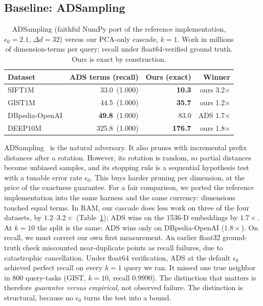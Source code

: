 \documentclass[sigconf, nonacm]{acmart}
\begin{document}
\subsection{Baseline: ADSampling}
\label{sec:ads}

\begin{table}[t]
\caption{ADSampling (faithful NumPy port of the reference implementation,
$\epsilon_0{=}2.1$, $\Delta d{=}32$) versus our PCA-only cascade, $k=1$.
Work in millions of dimension-terms per query; recall under
float64-verified ground truth. Ours is exact by construction.}
\label{tab:ads}
\small
\begin{tabular}{@{}lrrr@{}}
\toprule
Dataset & ADS terms (recall) & Ours (exact) & Winner \\
\midrule
SIFT1M & 33.0 \,(1.000) & \textbf{10.3} & ours 3.2$\times$ \\
GIST1M & 44.5 \,(1.000) & \textbf{35.7} & ours 1.2$\times$ \\
DBpedia-OpenAI & \textbf{49.8} \,(1.000) & 83.0 & ADS 1.7$\times$ \\
DEEP10M & 325.8 \,(1.000) & \textbf{176.7} & ours 1.8$\times$ \\
\bottomrule
\end{tabular}
\end{table}

ADSampling~\cite{adsampling} is the natural adversary. It also prunes
with incremental prefix distances after a rotation. However, its rotation
is random, so partial distances become unbiased samples, and its stopping
rule is a sequential hypothesis test with a tunable error rate
$\epsilon_0$. This buys harder pruning per dimension, at the price of the
exactness guarantee. For a fair comparison, we ported the reference
implementation into the same harness and the same currency: dimensions
touched equal terms. In RAM, our cascade does less work on three of the
four datasets, by $1.2$--$3.2\times$ (Table~\ref{tab:ads}); ADS wins on
the 1536-D embeddings by $1.7\times$. At $k{=}10$ the split is the same:
ADS wins only on DBpedia-OpenAI ($1.8\times$). On recall, we must correct
our own first measurement. An earlier float32 ground-truth check
miscounted near-duplicate points as recall failures, due to catastrophic
cancellation. Under float64 verification, ADS at the default $\epsilon_0$
achieved perfect recall on every $k{=}1$ query we ran. It missed one true
neighbor in 800 query-tasks (GIST, $k{=}10$, recall 0.9990). The
distinction that matters is therefore \emph{guarantee versus empirical},
not observed failure. The distinction is structural, because no
$\epsilon_0$ turns the test into a bound.
\end{document}
